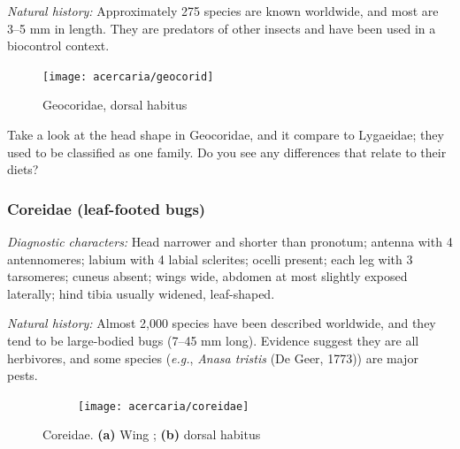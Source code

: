 \noindent{}\textit{Natural history:} Approximately 275 species are known worldwide, and most are 3--5 mm in length. They are predators of other insects and have been used in a biocontrol context.\vspace{3mm}

\begin{figure}[ht!]
 \centering
 \texttt{[image: acercaria/geocorid]}
 \caption{Geocoridae, dorsal habitus \citep[modified from][Fig. 11]{distant1904fauna}}
 \label{fig:geocorid1}
\end{figure}

\begin{theo}
{}Take a look at the head shape in Geocoridae, and it compare to Lygaeidae; they used to be classified as one family. Do you see any differences that relate to their diets?
\end{theo}

\subsubsection{Coreidae (leaf-footed bugs)}
\noindent{}\textit{Diagnostic characters:} Head narrower and shorter than pronotum; antenna with 4 antennomeres; labium with 4 labial sclerites; ocelli present; each leg with 3 tarsomeres; cuneus absent; wings wide, abdomen at most slightly exposed laterally; hind tibia usually widened, leaf-shaped.\vspace{3mm}

\noindent{}\textit{Natural history:} Almost 2,000 species have been described worldwide, and they tend to be large-bodied bugs (7--45 mm long). Evidence suggest they are all herbivores, and some species (\textit{e.g.}, \textit{Anasa tristis} (De Geer, 1773)) are major pests.\vspace{3mm}

\begin{figure}[ht!]
 \centering
 \begin{subfigure}[ht!]{0.35\textwidth}
  \caption{}
  \label{fig:coreid2}
 \end{subfigure}
 \hfill
  \begin{subfigure}[ht!]{0.45\textwidth}
  \texttt{[image: acercaria/coreidae]}
  \caption{}
  \label{fig:coreid1}
 \end{subfigure}
 \caption{Coreidae. \textbf{(a)} Wing \citep[][Fig. 139-4]{bhlitem16791elementary}; \textbf{(b)} dorsal habitus \citep[][Fig. 9]{chittenden1899some}}\label{fig:coreids}
\end{figure}


